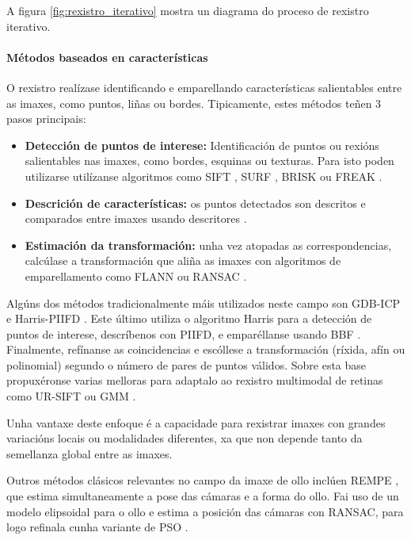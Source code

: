A figura \ref{fig:rexistro_iterativo} mostra un diagrama do proceso de rexistro iterativo.


\paragraph{Métodos baseados en características}
\label{par:Métodos baseados en características}

O rexistro realízase identificando e emparellando características salientables entre as imaxes, como puntos, liñas ou bordes.
Tipicamente, estes métodos teñen 3 pasos principais:

\begin{itemize}
\item \textbf{Detección de puntos de interese:} Identificación de puntos ou rexións salientables nas imaxes, como bordes, esquinas ou texturas. Para isto poden utilizarse utilízanse algoritmos como SIFT \cite{sift}, SURF \cite{surf}, BRISK \cite{brisk} ou FREAK \cite{freakkeypoint}.
\item \textbf{Descrición de características:}  os puntos detectados son descritos e comparados entre imaxes usando descritores .
\item \textbf{Estimación da transformación:} unha vez atopadas as correspondencias, calcúlase a transformación que aliña as imaxes con algoritmos de emparellamento como FLANN \cite{flann} ou RANSAC \cite{ransac}.
\end{itemize}

Algúns dos métodos tradicionalmente máis utilizados neste campo son \gls{GDB-ICP} \cite{GDB-ICP} e Harris-PIIFD \cite{piifd}. Este último utiliza o algoritmo Harris \cite{Harris1988ACC} para a detección de puntos de interese, descríbenos con \gls{PIIFD}, e emparéllanse usando \gls{BBF} \cite{BBF}.
 Finalmente, refínanse as coincidencias e escóllese a transformación (ríxida, afín ou polinomial) segundo o número de pares de puntos válidos. Sobre esta base propuxéronse varias melloras para adaptalo ao rexistro multimodal de retinas como UR-SIFT \cite{ur-sift} ou \gls{GMM} \cite{GMM}.

Unha vantaxe deste enfoque é a capacidade para rexistrar imaxes con grandes variacións locais ou modalidades diferentes, xa que non depende tanto da semellanza global entre as imaxes.

Outros métodos clásicos relevantes no campo da imaxe de ollo inclúen REMPE \cite{rempe}, que estima simultaneamente a pose das cámaras e a forma do ollo. Fai uso de un modelo elipsoidal para o ollo e estima a posición das cámaras con RANSAC, para logo refinala cunha variante de PSO \cite{pso}. 

